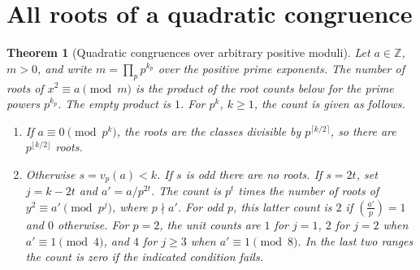 \documentclass[11pt,oneside,openany]{book}
\theoremstyle{plain}
\newtheorem{theorem}{Theorem}[chapter]
\theoremstyle{definition}
\theoremstyle{remark}
\begin{document}
\section{All roots of a quadratic congruence}

\begin{theorem}[Quadratic congruences over arbitrary positive moduli]
\label{nt:B09}
Let $a\in\mathbb Z$, $m>0$, and write $m=\prod_p p^{k_p}$ over
the positive prime exponents. The number of roots of
$x^2\equiv a\pmod m$ is the product of the root counts below
for the prime powers $p^{k_p}$. The empty product is $1$.
For $p^k$, $k\ge1$, the count is given as follows.
\begin{enumerate}
 \item If $a\equiv0\pmod{p^k}$, the roots are the classes
       divisible by $p^{\lceil k/2\rceil}$, so there are
       $p^{\lfloor k/2\rfloor}$ roots.
 \item Otherwise $s=v_p(a)<k$. If $s$ is odd there are no
       roots. If $s=2t$, set $j=k-2t$ and $a'=a/p^{2t}$.
       The count is $p^t$ times the number of roots of
       $y^2\equiv a'\pmod{p^j}$, where $p\nmid a'$.
       For odd $p$, this latter count is $2$ if
       $\left(\frac{a'}p\right)=1$ and $0$ otherwise.
       For $p=2$, the unit counts are $1$ for $j=1$,
       $2$ for $j=2$ when $a'\equiv1\pmod4$, and $4$ for
       $j\ge3$ when $a'\equiv1\pmod8$. In the last two
       ranges the count is zero if the indicated condition
       fails.
\end{enumerate}
\end{theorem}
\end{document}
